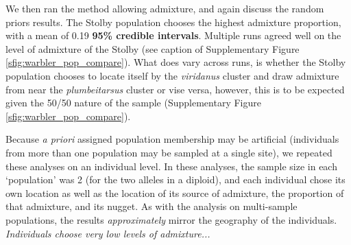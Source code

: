\documentclass[12pt]{article}
\newcommand{\gc}[1]{{\em \color{blue} #1}}
\begin{document}

We then ran the method allowing admixture, and again discuss the random priors results. The Stolby population chooses the highest admixture proportion, with a mean of 0.19 \textbf{95\% credible intervals}.  Multiple runs agreed well on the level of admixture of the Stolby (see caption of Supplementary Figure \ref{sfig:warbler_pop_compare}). What does vary across runs, is whether the Stolby population chooses to locate itself by the \textit{viridanus} cluster and draw admixture from near the \textit{plumbeitarsus}  cluster or vise versa, however, this is to be expected given the 50/50 nature of the sample (Supplementary Figure \ref{sfig:warbler_pop_compare}). 

Because \textit{a priori} assigned population membership may be artificial (individuals from more than one population may be sampled at a single site), we repeated these analyses on an individual level.  In these analyses, the sample size in each `population' was 2 (for the two alleles in a diploid), and each individual chose its own location as well as the location of its source of admixture, the proportion of that admixture, and its nugget.  As with the analysis on multi-sample populations, the results \gc{approximately} mirror the geography of the individuals.  \gc{Individuals choose very low levels of admixture...}

\end{document}
